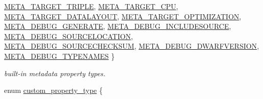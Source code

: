 \begin{DoxyCompactItemize}
\newline
\hyperlink{classevir_1_1Metadata_a292423b7a2d93f70382d1da4929f55a0a5991898f8f5af4a9fe3f6282af692cc0}{M\+E\+T\+A\+\_\+\+T\+A\+R\+G\+E\+T\+\_\+\+T\+R\+I\+P\+LE}, 
\newline
\hyperlink{classevir_1_1Metadata_a292423b7a2d93f70382d1da4929f55a0a7f488be475f84b1b122db86296ed1cd7}{M\+E\+T\+A\+\_\+\+T\+A\+R\+G\+E\+T\+\_\+\+C\+PU}, 
\newline
\hyperlink{classevir_1_1Metadata_a292423b7a2d93f70382d1da4929f55a0a0a5eb82f79545bbd09048581b425f6e7}{M\+E\+T\+A\+\_\+\+T\+A\+R\+G\+E\+T\+\_\+\+D\+A\+T\+A\+L\+A\+Y\+O\+UT}, 
\newline
\hyperlink{classevir_1_1Metadata_a292423b7a2d93f70382d1da4929f55a0a0a52141a0e9e2746d9a73b4c6a8bedb6}{M\+E\+T\+A\+\_\+\+T\+A\+R\+G\+E\+T\+\_\+\+O\+P\+T\+I\+M\+I\+Z\+A\+T\+I\+ON}, 
\newline
\hyperlink{classevir_1_1Metadata_a292423b7a2d93f70382d1da4929f55a0a275eff47a587f2589a63d33f253519ad}{M\+E\+T\+A\+\_\+\+D\+E\+B\+U\+G\+\_\+\+G\+E\+N\+E\+R\+A\+TE}, 
\newline
\hyperlink{classevir_1_1Metadata_a292423b7a2d93f70382d1da4929f55a0adbe6020a4e25d855a55d955c49d58518}{M\+E\+T\+A\+\_\+\+D\+E\+B\+U\+G\+\_\+\+I\+N\+C\+L\+U\+D\+E\+S\+O\+U\+R\+CE}, 
\newline
\hyperlink{classevir_1_1Metadata_a292423b7a2d93f70382d1da4929f55a0aeb281b4637aa1e74fe5885d7565c2837}{M\+E\+T\+A\+\_\+\+D\+E\+B\+U\+G\+\_\+\+S\+O\+U\+R\+C\+E\+L\+O\+C\+A\+T\+I\+ON}, 
\newline
\hyperlink{classevir_1_1Metadata_a292423b7a2d93f70382d1da4929f55a0a5a1731d19c350961ae70eb3a2e2b67f1}{M\+E\+T\+A\+\_\+\+D\+E\+B\+U\+G\+\_\+\+S\+O\+U\+R\+C\+E\+C\+H\+E\+C\+K\+S\+UM}, 
\newline
\hyperlink{classevir_1_1Metadata_a292423b7a2d93f70382d1da4929f55a0af1da53fed8e342f34a382bc44d8346f4}{M\+E\+T\+A\+\_\+\+D\+E\+B\+U\+G\+\_\+\+D\+W\+A\+R\+F\+V\+E\+R\+S\+I\+ON}, 
\newline
\hyperlink{classevir_1_1Metadata_a292423b7a2d93f70382d1da4929f55a0add040935fc7447b467728558a200753d}{M\+E\+T\+A\+\_\+\+D\+E\+B\+U\+G\+\_\+\+T\+Y\+P\+E\+N\+A\+M\+ES}
 \}\begin{DoxyCompactList}\small\item\em built-\/in metadata property types. \end{DoxyCompactList}
\item 
enum \hyperlink{classevir_1_1Metadata_a6ccc55dee8a150a9917bc1204fdf4c3a}{custom\+\_\+property\+\_\+type} \{ \newline

\end{DoxyCompactItemize}
